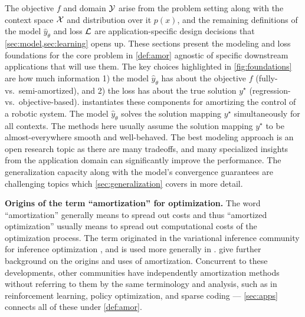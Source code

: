 The objective $f$ and domain ${\mathcal{Y}}$ arise from
the problem setting along with the context space
${\mathcal{X}}$ and distribution over it $p(x)$, and
the remaining definitions of the model
$\hat y_\theta$ and loss ${\mathcal{L}}$ are application-specific
design decisions that \cref{sec:model,sec:learning}
opens up.
These sections present the modeling and loss foundations
for the core problem in \cref{def:amor} agnostic
of specific downstream applications that will use them.
The key choices highlighted in \cref{fig:foundations}
are how much information
1) the model $\hat y_\theta$ has about the
objective $f$ (fully- vs.~semi-amortized), and
2) the loss has about the true solution $y^\star$
(regression- vs.~objective-based).
 instantiates these components
for amortizing the control of a robotic system.
The model $\hat y_\theta$ solves the solution mapping
$y^\star$ simultaneously for all contexts.
The methods here usually assume the solution mapping
$y^\star$ to be almost-everywhere smooth
and well-behaved.
The best modeling approach is an open research topic
as there are many tradeoffs,
and many specialized insights from the application domain
can significantly improve the performance.
The generalization capacity along with the model's
convergence guarantees are challenging topics
which \cref{sec:generalization} covers in more detail.

\textbf{Origins of the term ``amortization'' for optimization.}
The word ``amortization'' generally means to spread out costs and
thus ``amortized optimization'' usually means to spread out
computational costs of the optimization process.
The term originated in the variational inference community
for inference optimization
\citep{kingma2013auto,rezende2014stochastic,stuhlmuller2013learning,gershman2014amortized,webb2017faithful,ravi2018amortized,cremer2018inference,wu2020meta},
and is used more generally in
\citet{xue2020amortized,sercu2021neural,xiao2021amortized}.
\citet[p.~28]{marino2021learned} give further background on the
origins and uses of amortization.
Concurrent to these developments, other communities have
independently amortization methods without referring to them
by the same terminology and analysis, such as in reinforcement learning,
policy optimization, and sparse coding ---
\cref{sec:apps} connects all of these under \cref{def:amor}.

